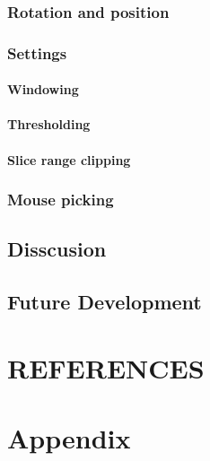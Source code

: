 \documentclass[twoside, english, 11pt]{report}
\begin{document}
\subsection{Rotation and position}
\subsection{Settings}
\subsubsection{Windowing}
\subsubsection{Thresholding}
\subsubsection{Slice range clipping}
\subsection{Mouse picking}

\section{Disscusion}

\section{Future Development}

\chapter{REFERENCES}

\chapter{Appendix}
\end{document}
